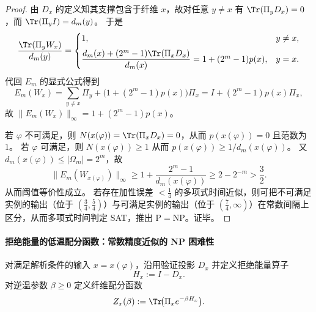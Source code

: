 \begin{proof}
由 \(D_x\) 的定义知其支撑包含于纤维 \(x\)，故对任意 \(y\neq x\) 有 \(\Tr(\Pi_yD_x)=0\)，而 \(\Tr(\Pi_yI)=d_m(y)\)。
于是
\[
\frac{\Tr(\Pi_yW_x)}{d_m(y)}=
\begin{cases}
1,& y\neq x,\\[2mm]
\dfrac{d_m(x)+(2^m-1)\Tr(\Pi_xD_x)}{d_m(x)}=1+(2^m-1)p(x),& y=x.
\end{cases}
\]
代回 \(E_m\) 的显式公式得到
\[
E_m(W_x)=\sum_{y\neq x}\Pi_y+\bigl(1+(2^m-1)p(x)\bigr)\Pi_x
=I+(2^m-1)p(x)\Pi_x,
\]
故 \(\|E_m(W_x)\|_\infty=1+(2^m-1)p(x)\)。
\par
若 \(\varphi\) 不可满足，则 \(N(x(\varphi))=\Tr(\Pi_xD_x)=0\)，从而 \(p(x(\varphi))=0\) 且范数为 \(1\)。
若 \(\varphi\) 可满足，则 \(N(x(\varphi))\ge 1\) 从而 \(p(x(\varphi))\ge 1/d_m(x(\varphi))\)。
又 \(d_m(x(\varphi))\le |\Omega_m|=2^m\)，故
\[
\|E_m(W_{x(\varphi)})\|_\infty
\ge 1+\frac{2^m-1}{d_m(x(\varphi))}
\ge 2-2^{-m}
>\frac32.
\]
从而阈值等价性成立。
若存在加性误差 \(<\tfrac14\) 的多项式时间近似，则可把不可满足实例的输出（位于 \((\tfrac34,\tfrac54)\)）与可满足实例的输出（位于 \((\tfrac74,\infty)\)）在常数间隔上区分，从而多项式时间判定 SAT，推出 \(\mathrm{P}=\mathrm{NP}\)。证毕。
\end{proof}

\paragraph{拒绝能量的低温配分函数：常数精度近似的 NP 困难性}
对满足解析条件的输入 \(x=x(\varphi)\)，沿用验证投影 \(D_x\) 并定义拒绝能量算子
\[
H_x:=I-D_x.
\]
对逆温参数 \(\beta\ge 0\) 定义纤维配分函数
\[
Z_x(\beta):=\Tr\!\bigl(\Pi_x e^{-\beta H_x}\bigr).
\]

